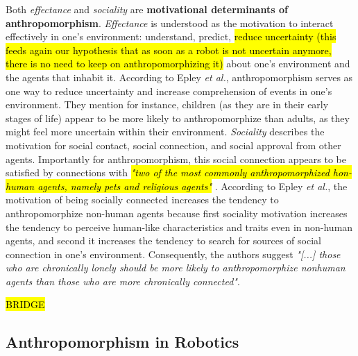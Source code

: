 \documentclass[twocolumn]{svjour3}          %
\begin{document}
	Both \textit{effectance} and \textit{sociality} are \textbf{motivational determinants of anthropomorphism}. \textit{Effectance} is understood as the motivation to interact effectively in one's environment: understand, predict, \hl{reduce uncertainty (this feeds again our hypothesis that as soon as a robot is not uncertain anymore, there is no need to keep on anthropomorphizing it)} about one's environment and the agents that inhabit it. According to Epley \textit{et al.}, anthropomorphism serves as one way to reduce uncertainty and increase comprehension of events in one's environment. They mention for instance, children (as they are in their early stages of life) appear to be more likely to anthropomorphize than adults, as they might feel more uncertain within their environment.
	\textit{Sociality} describes the motivation for social contact, social connection, and social approval from other agents. Importantly for anthropomorphism, this social connection appears to be satisfied by connections with \hl{ \textit{"two of the most commonly anthropomorphized hon-human agents, namely pets and religious agents"}} \cite{epley_seeing_2007}. According to Epley \textit{et al.}, the motivation of being socially connected increases the tendency to anthropomorphize non-human agents because first sociality motivation increases the tendency to perceive human-like characteristics and traits even in non-human agents, and second it increases the tendency to search for sources of social connection in one's environment. Consequently, the authors suggest \textit{"[...] those who are chronically lonely should be more likely to anthropomorphize nonhuman agents than those who are more chronically connected"}. 
	
	\hl{BRIDGE}
	


\subsection{Anthropomorphism in Robotics}
\label{sec:3.3}
	
\end{document}
